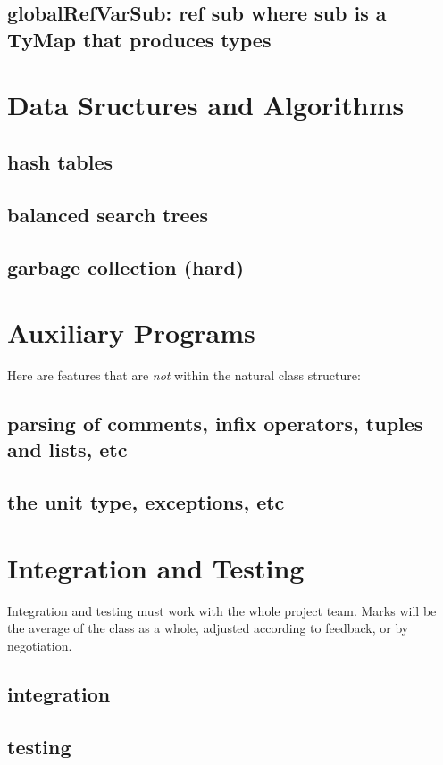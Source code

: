 \documentclass[12pt]{article}
\begin{document}
\subsection{globalRefVarSub: ref sub where sub is a TyMap that produces types}


\section{Data Sructures and Algorithms }
\subsection{hash tables}
\subsection{balanced search trees}
\subsection{garbage collection (hard)} 

\section{Auxiliary Programs}
Here are features that are {\em not} within the natural class structure:

\subsection{parsing of comments, infix operators, tuples and lists, etc}
\subsection{ the unit type, exceptions, etc }



\section{Integration and Testing}
Integration and testing must work with the whole project team.  Marks
will be the average of the class as a whole, adjusted according to
feedback, or by negotiation. 

\subsection{integration}
\subsection{testing}




\end{document}
